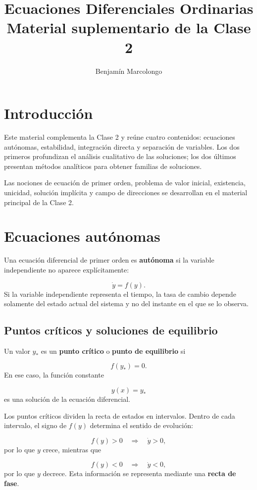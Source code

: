 \documentclass[12pt,a4paper]{article}
\title{Ecuaciones Diferenciales Ordinarias\\Material suplementario de la Clase 2}
\author{Benjamín Marcolongo}
\date{}
\begin{document}
	\maketitle

	\section*{Introducción}

	Este material complementa la Clase 2 y reúne cuatro contenidos: ecuaciones autónomas, estabilidad, integración directa y separación de variables. Los dos primeros profundizan el análisis cualitativo de las soluciones; los dos últimos presentan métodos analíticos para obtener familias de soluciones.

	Las nociones de ecuación de primer orden, problema de valor inicial, existencia, unicidad, solución implícita y campo de direcciones se desarrollan en el material principal de la Clase 2.

	\clearpage
	\section{Ecuaciones autónomas}

	Una ecuación diferencial de primer orden es \textbf{autónoma} si la variable independiente no aparece explícitamente:

	\[
	\dot{y}=f(y).
	\]
Si la variable independiente representa el tiempo, la tasa de cambio depende solamente del estado actual del sistema y no del instante en el que se lo observa.

	\subsection{Puntos críticos y soluciones de equilibrio}

	Un valor \(y_\ast\) es un \textbf{punto crítico} o \textbf{punto de equilibrio} si

	\[
	f(y_\ast)=0.
	\]
En ese caso, la función constante

	\[
	y(x)=y_\ast
	\]
es una solución de la ecuación diferencial.

	Los puntos críticos dividen la recta de estados en intervalos. Dentro de cada intervalo, el signo de \(f(y)\) determina el sentido de evolución:

	\[
	f(y)>0 \quad\Longrightarrow\quad \dot{y}>0,
	\]
por lo que \(y\) crece, mientras que

	\[
	f(y)<0 \quad\Longrightarrow\quad \dot{y}<0,
	\]
por lo que \(y\) decrece. Esta información se representa mediante una \textbf{recta de fase}.
\end{document}
